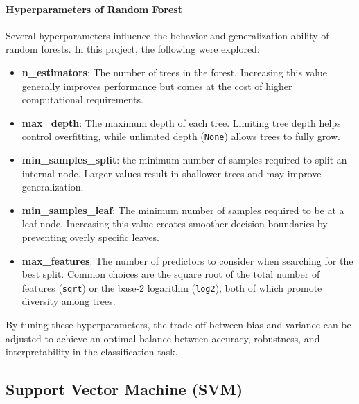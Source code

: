 \paragraph{Hyperparameters of Random Forest}
Several hyperparameters influence the behavior and generalization ability of random forests. In this project, the following were explored:
\begin{itemize}
    \item \textbf{n\_estimators}: The number of trees in the forest. Increasing this value generally improves performance but comes at the cost of higher computational requirements.
    \item \textbf{max\_depth}: The maximum depth of each tree. Limiting tree depth helps control overfitting, while unlimited depth (\texttt{None}) allows trees to fully grow.
    \item \textbf{min\_samples\_split}: the minimum number of samples required to split an internal node. Larger values result in shallower trees and may improve generalization.
    \item \textbf{min\_samples\_leaf}: The minimum number of samples required to be at a leaf node. Increasing this value creates smoother decision boundaries by preventing overly specific leaves.
    \item \textbf{max\_features}: The number of predictors to consider when searching for the best split. Common choices are the square root of the total number of features (\texttt{sqrt}) or the base-2 logarithm (\texttt{log2}), both of which promote diversity among trees.
\end{itemize}

By tuning these hyperparameters, the trade-off between bias and variance can be adjusted to achieve an optimal balance between accuracy, robustness, and interpretability in the classification task.

\subsection{Support Vector Machine (SVM)}\label{subsec:method-svm}

